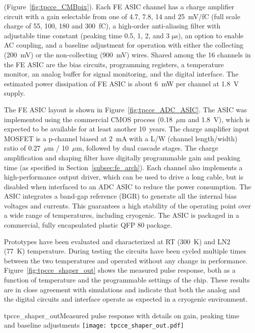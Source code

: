  
   (Figure~\ref{fig:tpcce_CMBpix}).
Each FE ASIC channel has a charge amplifier circuit with a gain selectable from one of 4.7, 7.8, 14 and 25~mV/fC
(full scale charge of 55, 100, 180 and 300~fC),
a high-order anti-aliasing filter with adjustable time
constant (peaking time 0.5, 1, 2, and 3 $\mathrm{\mu}$s),
an option to enable AC coupling,
and a baseline adjustment for operation with either the collecting (200~mV) or the non-collecting (900~mV) wires.
Shared among the 16 channels in the FE ASIC are the bias circuits, programming registers,
a temperature monitor, an analog buffer for signal monitoring, and the digital interface.
The estimated power dissipation of FE ASIC is about 6~mW per channel at 1.8~V supply.

The FE ASIC layout is shown in Figure~\ref{fig:tpcce_ADC_ASIC}.
The ASIC was implemented using the commercial CMOS process (0.18~$\mu$m and 1.8~V), which 
is expected to be available for at least another 10~years. 
The charge amplifier input MOSFET is a p-channel biased at 2~mA with a L/W (channel length/width) ratio
of 0.27~$\mu$m / 10~$\mu$m, followed by dual cascade stages.
The charge amplification and shaping filter have digitally programmable gain and peaking time
(as specified in Section~\ref{subsec:fe_arch}).
Each channel also implements a high-performance output driver,
which can be used to drive a long cable, but is disabled when interfaced to an ADC ASIC to reduce the power consumption.
The ASIC integrates a band-gap reference (BGR) to generate all the internal bias voltages and currents.
This guarantees a high stability of the operating point over a wide range of
temperatures, including cryogenic.
The ASIC is packaged in a commercial, fully encapsulated plastic QFP 80 package.

Prototypes have been evaluated and characterized at RT (300~K) and LN2 (77~K) temperature.
During testing the circuits have been cycled multiple times
between the two temperatures and operated without any change in performance.
Figure~\ref{fig:tpcce_shaper_out} shows the measured pulse response, both as a function
of temperature and the programmable settings of the chip.
These results are in close agreement with simulations and indicate
that both the analog and the digital circuits and interface operate as
expected in a cryogenic environment.

\begin{cdrfigure}{tpcce_shaper_out}{Measured pulse response with
 details on gain, peaking time and baseline adjustments}
\texttt{[image: tpcce\_shaper\_out.pdf]}
\end{cdrfigure}

